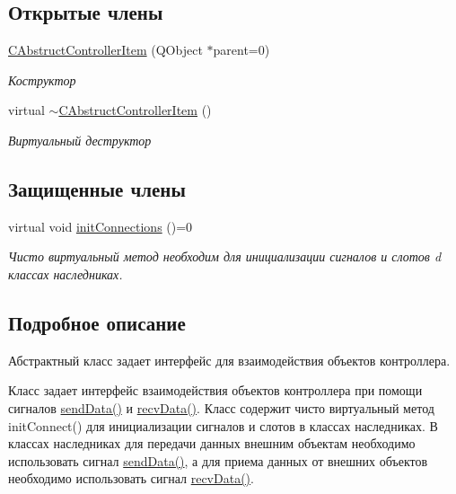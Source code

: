 \subsection*{Открытые члены}
\begin{DoxyCompactItemize}
\item 
\hyperlink{class_c_abstruct_controller_item_a1d99654a9522cc8721a329d1dcee35a4}{C\+Abstruct\+Controller\+Item} (Q\+Object $\ast$parent=0)
\begin{DoxyCompactList}\small\item\em Коструктор \end{DoxyCompactList}\item 
\hypertarget{class_c_abstruct_controller_item_a807bca71bd9a2966e60ec5c3c807f359}{}\label{class_c_abstruct_controller_item_a807bca71bd9a2966e60ec5c3c807f359} 
virtual \hyperlink{class_c_abstruct_controller_item_a807bca71bd9a2966e60ec5c3c807f359}{$\sim$\+C\+Abstruct\+Controller\+Item} ()
\begin{DoxyCompactList}\small\item\em Виртуальный деструктор \end{DoxyCompactList}\end{DoxyCompactItemize}
\subsection*{Защищенные члены}
\begin{DoxyCompactItemize}
\item 
\hypertarget{class_c_abstruct_controller_item_a27c6889230a86cb0782e6d7596b883c1}{}\label{class_c_abstruct_controller_item_a27c6889230a86cb0782e6d7596b883c1} 
virtual void \hyperlink{class_c_abstruct_controller_item_a27c6889230a86cb0782e6d7596b883c1}{init\+Connections} ()=0
\begin{DoxyCompactList}\small\item\em Чисто виртуальный метод необходим для инициализации сигналов и слотов d классах наследниках. \end{DoxyCompactList}\end{DoxyCompactItemize}


\subsection{Подробное описание}
Абстрактный класс задает интерфейс для взаимодействия объектов контроллера. 

Класс задает интерфейс взаимодействия объектов контроллера при помощи сигналов \hyperlink{class_c_abstruct_controller_item_a7cf2bebc87a7d0b660318e946a176eb9}{send\+Data()} и \hyperlink{class_c_abstruct_controller_item_a6898e48061cb0cac2065f8193bd386c1}{recv\+Data()}. Класс содержит чисто виртуальный метод init\+Connect() для инициализации сигналов и слотов в классах наследниках. В классах наследниках для передачи данных внешним объектам необходимо использовать сигнал \hyperlink{class_c_abstruct_controller_item_a7cf2bebc87a7d0b660318e946a176eb9}{send\+Data()}, а для приема данных от внешних объектов необходимо использовать сигнал \hyperlink{class_c_abstruct_controller_item_a6898e48061cb0cac2065f8193bd386c1}{recv\+Data()}. 


